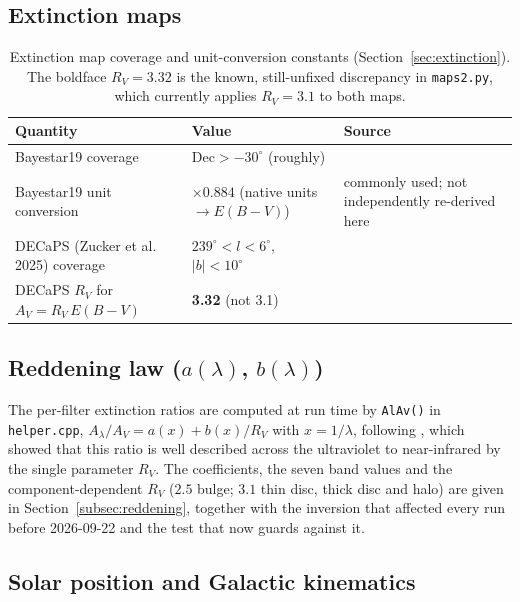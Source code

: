 \documentclass[english,10pt,a4paper]{article}
\begin{document}
	\subsection{Extinction maps}
	
	\begin{table}[htbp]
		\centering
		\begin{tabular}{lll}
			\toprule
			Quantity & Value & Source \\
			\midrule
			Bayestar19 coverage & $\mathrm{Dec}>-30^{\circ}$ (roughly) & \cite{Green2019Bayestar} \\
			Bayestar19 unit conversion & $\times0.884$ (native units $\to E(B-V)$) & commonly used; not independently re-derived here \\
			DECaPS (Zucker et al. 2025) coverage & $239^{\circ}<l<6^{\circ}$, $|b|<10^{\circ}$ & \cite{Zucker2025DECaPS} \\
			DECaPS $R_V$ for $A_V=R_V\,E(B-V)$ & \textbf{3.32} (not 3.1) & \cite{DustmapsDocs} \\
			\bottomrule
		\end{tabular}
		\caption{Extinction map coverage and unit-conversion constants (Section~\ref{sec:extinction}). The boldface $R_V=3.32$ is the known, still-unfixed discrepancy in \texttt{maps2.py}, which currently applies $R_V=3.1$ to both maps.}
		\label{tab:extinction_maps}
	\end{table}
	
	\subsection{Reddening law ($a(\lambda)$, $b(\lambda)$)}
	
	The per-filter extinction ratios are computed at run time by \texttt{AlAv()} in \texttt{helper.cpp}, $A_\lambda/A_V = a(x) + b(x)/R_V$ with $x = 1/\lambda$, following \cite{Cardelli1989}, which showed that this ratio is well described across the ultraviolet to near-infrared by the single parameter $R_V$. The coefficients, the seven band values and the component-dependent $R_V$ ($2.5$ bulge; $3.1$ thin disc, thick disc and halo) are given in Section~\ref{subsec:reddening}, together with the inversion that affected every run before 2026-09-22 and the test that now guards against it.
	
	\subsection{Solar position and Galactic kinematics}
	
\end{document}
